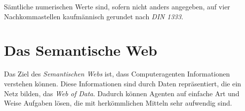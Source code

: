 Sämtliche numerischen Werte sind, sofern nicht anders angegeben, auf vier Nachkommastellen kaufmännisch gerundet nach \emph{DIN 1333}.

\FloatBarrier
\section{Das Semantische Web}
Das Ziel des \emph{Semantischen Webs} ist, dass Computeragenten Informationen verstehen können.
Diese Informationen sind durch Daten repräsentiert, die ein Netz bilden, das \emph{Web of Data}.
Dadurch können Agenten auf einfache Art und Weise Aufgaben lösen, die mit herkömmlichen Mitteln sehr aufwendig sind.

